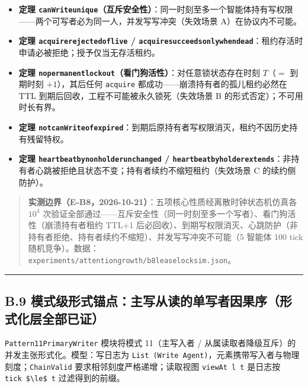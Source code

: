\documentclass[
]{ctexart}
\providecommand{\tightlist}{%
  \setlength{\itemsep}{0pt}\setlength{\parskip}{0pt}}
\renewcommand{\_}{\discretionary{}{}{\textunderscore}}
\begin{document}
\begin{itemize}
\tightlist
\item
  \textbf{定理
  \texttt{canWrite\_unique}（互斥安全性）}：同一时刻至多一个智能体持有写权限------两个可写者必为同一人，并发写写冲突（失效场景
  A）在协议内不可能。
\item
  \textbf{定理 \texttt{acquire\_rejected\_of\_live} /
  \texttt{acquire\_succeeds\_only\_when\_dead}}：租约存活时申请必被拒绝；授予仅当无存活租约。
\item
  \textbf{定理
  \texttt{no\_permanent\_lockout}（看门狗活性）}：对任意锁状态存在时刻
  \(T\)（\(=\) 到期时刻 \(+1\)），其后任何 \texttt{acquire}
  都成功------崩溃持有者的孤儿租约必然在 TTL
  到期后回收，工程不可能被永久锁死（失效场景 B
  的形式否定）；不可用时长有界。
\item
  \textbf{定理
  \texttt{not\_canWrite\_of\_expired}}：到期后原持有者写权限消灭，租约不因历史持有残留特权。
\item
  \textbf{定理 \texttt{heartbeat\_by\_nonholder\_unchanged} /
  \texttt{heartbeat\_by\_holder\_extends}}：非持有者心跳被拒绝且状态不变；持有者续约不缩短租约（失效场景
  C 的续约侧防护）。
\end{itemize}

\begin{quote}
\textbf{实测边界（E-B8，2026-10-21）}：五项核心性质经离散时钟状态机仿真各
\(10^4\)
次验证全部通过------互斥安全性（同一时刻至多一个写者）、看门狗活性（崩溃持有者租约
TTL+1
后必回收）、到期写权限消灭、心跳防护（非持有者拒绝、持有者续约不缩短）、并发写写冲突不可能（5
智能体 100 tick
随机竞争）。数据：\texttt{experiments/attention\_growth/b8\_lease\_lock\_sim.json}。
\end{quote}

\begin{center}\rule{0.5\linewidth}{0.5pt}\end{center}

\subsection{B.9
模式级形式锚点：主写从读的单写者因果序（形式化层全部已证）}\label{b.9-ux6a21ux5f0fux7ea7ux5f62ux5f0fux951aux70b9ux4e3bux5199ux4eceux8bfbux7684ux5355ux5199ux8005ux56e0ux679cux5e8fux5f62ux5f0fux5316ux5c42ux5168ux90e8ux5df2ux8bc1}

\texttt{Pattern11\_PrimaryWriter} 模块将模式 11（主写入者 /
从属读取者降级互斥）的并发主张形式化。模型：写日志为
\texttt{List\ (Write\ Agent)}，元素携带写入者与物理刻度；\texttt{ChainValid}
要求相邻刻度严格递增；读取视图 \texttt{viewAt\ l\ t} 是日志按
\texttt{tick\ \$\textbackslash{}le\$\ t} 过滤得到的前缀。
\end{document}
